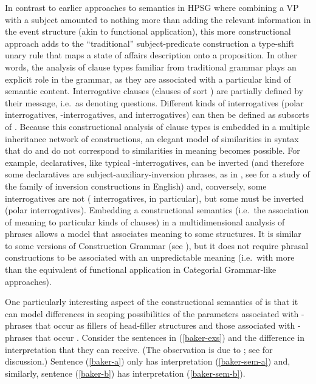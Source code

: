 \documentclass[output=paper
 	        ,biblatex
                ,babelshorthands
                ,newtxmath
                ,draftmode
                ,colorlinks, citecolor=brown
]{langscibook}
\begin{document}
In contrast to earlier approaches to semantics in HPSG where combining a VP with a subject amounted to nothing more than adding the relevant information in the event structure (akin to functional application), this more constructional approach adds to the ``traditional'' subject-predicate construction a type-shift unary rule that maps a state of affairs description onto a proposition. In other words, the analysis of clause types familiar from traditional grammar plays an explicit role in the grammar, as they are associated  with a particular kind of semantic content.  Interrogative clauses (clauses of sort ) are partially defined by their message, i.e.\ as denoting questions. Different kinds of interrogatives (polar interrogatives, -interrogatives, and  interrogatives) can then be defined as subsorts of . Because this constructional analysis of clause types is embedded in a multiple inheritance network of constructions, an elegant model of similarities in syntax that do and do not correspond to similarities in meaning becomes possible. For example,  declaratives, like typical -interrogatives, can be inverted (and therefore some declaratives are subject-auxiliary-inversion phrases, as in , see \citealt{Fillmore1999} for a study of the family of inversion constructions in English) and, conversely, some interrogatives are not ( interrogatives, in particular), but some must be inverted (polar interrogatives). Embedding a constructional semantics (i.e.\ the association of meaning to particular kinds of clauses) in a multidimensional analysis of phrases allows a model that associates meaning to some structures.
It is similar to some versions of Construction Grammar (see ), but it does not require phrasal constructions to be associated with an unpredictable meaning (i.e.\ with more than the equivalent of functional application in Categorial Grammar-like approaches). 

One particularly interesting aspect of the constructional semantics of \citet{GinzburgandSag2001} is that it can model differences in scoping possibilities of the parameters associated with -phrases that occur as fillers of head-filler structures and those associated with -phrases that occur . Consider the sentences in (\ref{baker-exs}) and the difference in interpretation that they can receive. (The observation is due to \citealt{Baker1970a}; see \citealt[242--246]{GinzburgandSag2001} for discussion.) Sentence (\ref{baker-a}) only has interpretation (\ref{baker-sem-a}) and, similarly, sentence (\ref{baker-b}) has interpretation (\ref{baker-sem-b}).
\end{document}
